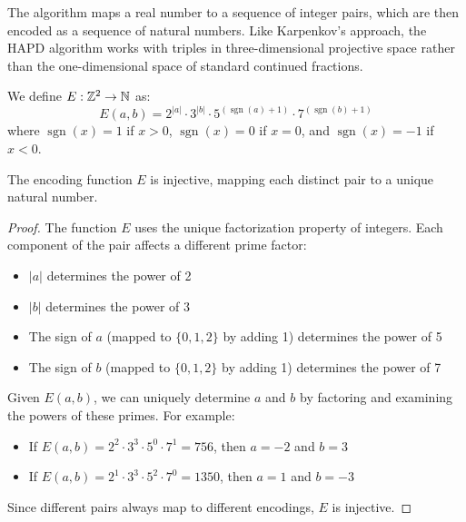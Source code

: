 The algorithm maps a real number to a sequence of integer pairs, which are then encoded as a sequence of natural numbers. Like Karpenkov's approach, the HAPD algorithm works with triples in three-dimensional projective space rather than the one-dimensional space of standard continued fractions.

\begin{definition}\label{def:encoding}
We define $E : \mathbb{Z}^2 \to \mathbb{N}$ as:
\begin{equation}
E(a, b) = 2^{|a|} \cdot 3^{|b|} \cdot 5^{(\operatorname{sgn}(a)+1)} \cdot 7^{(\operatorname{sgn}(b)+1)}
\end{equation}
where $\operatorname{sgn}(x) = 1$ if $x > 0$, $\operatorname{sgn}(x) = 0$ if $x = 0$, and $\operatorname{sgn}(x) = -1$ if $x < 0$.
\end{definition}

\begin{lemma}\label{lem:encoding_injective}
The encoding function $E$ is injective, mapping each distinct pair to a unique natural number.
\end{lemma}

\begin{proof}
The function $E$ uses the unique factorization property of integers. Each component of the pair affects a different prime factor:
\begin{itemize}
    \item $|a|$ determines the power of 2
    \item $|b|$ determines the power of 3
    \item The sign of $a$ (mapped to $\{0,1,2\}$ by adding 1) determines the power of 5
    \item The sign of $b$ (mapped to $\{0,1,2\}$ by adding 1) determines the power of 7
\end{itemize}

Given $E(a,b)$, we can uniquely determine $a$ and $b$ by factoring and examining the powers of these primes. For example:
\begin{itemize}
    \item If $E(a,b) = 2^2 \cdot 3^3 \cdot 5^0 \cdot 7^1 = 756$, then $a = -2$ and $b = 3$
    \item If $E(a,b) = 2^1 \cdot 3^3 \cdot 5^2 \cdot 7^0 = 1350$, then $a = 1$ and $b = -3$
\end{itemize}

Since different pairs always map to different encodings, $E$ is injective.
\end{proof}


